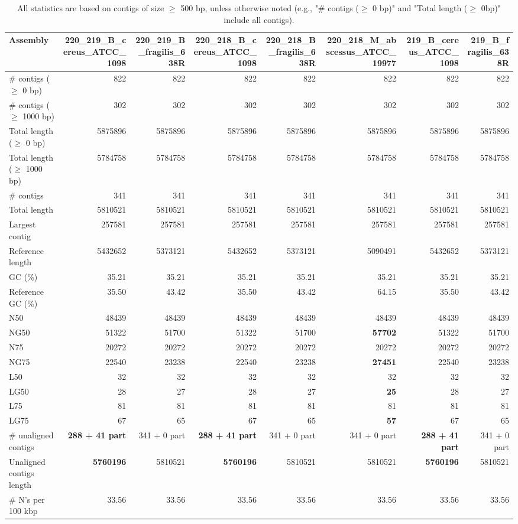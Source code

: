 \documentclass[12pt,a4paper]{article}
\begin{document}
\begin{table}[ht]
\begin{center}
\caption{All statistics are based on contigs of size $\geq$ 500 bp, unless otherwise noted (e.g., "\# contigs ($\geq$ 0 bp)" and "Total length ($\geq$ 0bp)" include all contigs).}
\begin{tabular}{|l*{7}{|r}|}
\hline
Assembly & 220\_219\_B\_cereus\_ATCC\_1098 & 220\_219\_B\_fragilis\_638R & 220\_218\_B\_cereus\_ATCC\_1098 & 220\_218\_B\_fragilis\_638R & 220\_218\_M\_abscessus\_ATCC\_19977 & 219\_B\_cereus\_ATCC\_1098 & 219\_B\_fragilis\_638R \\ \hline
\# contigs ($\geq$ 0 bp) & 822 & 822 & 822 & 822 & 822 & 822 & 822 \\ \hline
\# contigs ($\geq$ 1000 bp) & 302 & 302 & 302 & 302 & 302 & 302 & 302 \\ \hline
Total length ($\geq$ 0 bp) & 5875896 & 5875896 & 5875896 & 5875896 & 5875896 & 5875896 & 5875896 \\ \hline
Total length ($\geq$ 1000 bp) & 5784758 & 5784758 & 5784758 & 5784758 & 5784758 & 5784758 & 5784758 \\ \hline
\# contigs & 341 & 341 & 341 & 341 & 341 & 341 & 341 \\ \hline
Total length & 5810521 & 5810521 & 5810521 & 5810521 & 5810521 & 5810521 & 5810521 \\ \hline
Largest contig & 257581 & 257581 & 257581 & 257581 & 257581 & 257581 & 257581 \\ \hline
Reference length & 5432652 & 5373121 & 5432652 & 5373121 & 5090491 & 5432652 & 5373121 \\ \hline
GC (\%) & 35.21 & 35.21 & 35.21 & 35.21 & 35.21 & 35.21 & 35.21 \\ \hline
Reference GC (\%) & 35.50 & 43.42 & 35.50 & 43.42 & 64.15 & 35.50 & 43.42 \\ \hline
N50 & 48439 & 48439 & 48439 & 48439 & 48439 & 48439 & 48439 \\ \hline
NG50 & 51322 & 51700 & 51322 & 51700 & {\bf 57702} & 51322 & 51700 \\ \hline
N75 & 20272 & 20272 & 20272 & 20272 & 20272 & 20272 & 20272 \\ \hline
NG75 & 22540 & 23238 & 22540 & 23238 & {\bf 27451} & 22540 & 23238 \\ \hline
L50 & 32 & 32 & 32 & 32 & 32 & 32 & 32 \\ \hline
LG50 & 28 & 27 & 28 & 27 & {\bf 25} & 28 & 27 \\ \hline
L75 & 81 & 81 & 81 & 81 & 81 & 81 & 81 \\ \hline
LG75 & 67 & 65 & 67 & 65 & {\bf 57} & 67 & 65 \\ \hline
\# unaligned contigs & {\bf 288 + 41 part} & 341 + 0 part & {\bf 288 + 41 part} & 341 + 0 part & 341 + 0 part & {\bf 288 + 41 part} & 341 + 0 part \\ \hline
Unaligned contigs length & {\bf 5760196} & 5810521 & {\bf 5760196} & 5810521 & 5810521 & {\bf 5760196} & 5810521 \\ \hline
\# N's per 100 kbp & 33.56 & 33.56 & 33.56 & 33.56 & 33.56 & 33.56 & 33.56 \\ \hline
\end{tabular}
\end{center}
\end{table}
\end{document}
